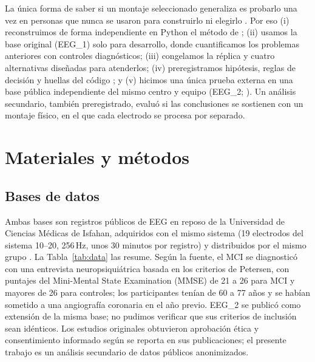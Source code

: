 La única forma de saber si un montaje seleccionado generaliza es probarlo una vez en personas que nunca se usaron para construirlo ni elegirlo \citep{collins2024}. Por eso (i) reconstruimos de forma independiente en Python el método de \citet{aljalal2024}; (ii) usamos la base original (EEG\_1) solo para desarrollo, donde cuantificamos los problemas anteriores con controles diagnósticos; (iii) congelamos la réplica y cuatro alternativas diseñadas para atenderlos; (iv) preregistramos hipótesis, reglas de decisión y huellas del código \citep{nosek2018,osfprereg}; y (v) hicimos una única prueba externa en una base pública independiente del mismo centro y equipo (EEG\_2; \citealp{kashefpoor2019}). Un análisis secundario, también preregistrado, evaluó si las conclusiones se sostienen con un montaje físico, en el que cada electrodo se procesa por separado.

\section{Materiales y métodos}

\subsection{Bases de datos}

Ambas bases son registros públicos de EEG en reposo de la Universidad de Ciencias Médicas de Isfahan, adquiridos con el mismo sistema (19 electrodos del sistema 10--20, 256\,Hz, unos 30 minutos por registro) y distribuidos por el mismo grupo \citep{kashefpoor2016,kashefpoor2019}. La Tabla~\ref{tab:data} las resume. Según la fuente, el MCI se diagnosticó con una entrevista neuropsiquiátrica basada en los criterios de Petersen, con puntajes del Mini-Mental State Examination (MMSE) de 21 a 26 para MCI y mayores de 26 para controles; los participantes tenían de 60 a 77 años y se habían sometido a una angiografía coronaria en el año previo. EEG\_2 se publicó como extensión de la misma base; no pudimos verificar que sus criterios de inclusión sean idénticos. Los estudios originales obtuvieron aprobación ética y consentimiento informado según se reporta en sus publicaciones; el presente trabajo es un análisis secundario de datos públicos anonimizados.


